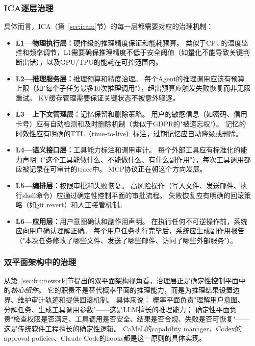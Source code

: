 \subsubsection{ICA逐层治理}
具体而言，ICA（第~\ref{sec:icam}节）的每一层都需要对应的治理机制：

\begin{itemize}[nosep]
\item \textbf{L1---物理执行层：}硬件级的推理精度保证和能耗预算。
类似于CPU的温度监控和频率调节，L1需要确保推理精度不低于安全阈值（如量化不能导致关键判断出错），以及GPU/TPU的能耗在可控范围内。

\item \textbf{L2---推理服务层：}推理预算和精度治理。
每个Agent的推理调用应该有预算上限（如"每个子任务最多10次推理调用"），超出预算应触发失败恢复而非无限重试。
KV缓存管理需要保证关键状态不被意外驱逐。

\item \textbf{L3---上下文管理层：}记忆保留和删除策略。
用户的敏感信息（如密码、信用卡号）应有自动检测和及时删除机制（类似于GDPR的"被遗忘权"）。
记忆的时效性应有明确的TTL（time-to-live）标注，过期记忆应自动降级或删除。

\item \textbf{L4---语义接口层：}工具能力标注和调用审计。
每个外部工具应有标准化的能力声明（"这个工具能做什么、不能做什么、有什么副作用"），每次工具调用都应被记录在可审计的trace中。
MCP协议\cite{mcp_intro_2026}正在朝这个方向发展。

\item \textbf{L5---编排层：}权限审批和失败恢复。
高风险操作（写入文件、发送邮件、执行shell命令）应通过确定性控制平面的审批流程。
失败恢复应有明确的回滚策略（如git revert）和人工接管机制。

\item \textbf{L6---应用层：}用户意图确认和副作用声明。
在执行任何不可逆操作前，系统应向用户确认理解正确。
每个用户任务执行完毕后，系统应生成副作用报告（"本次任务修改了哪些文件、发送了哪些邮件、访问了哪些外部服务"）。
\end{itemize}

\subsubsection{双平面架构中的治理}
从第~\ref{sec:framework}节提出的双平面架构视角看，治理层正是确定性控制平面中的\emph{核心组件}。
它的职责不是替代概率平面的推理能力，而是为推理结果设置边界、维护审计轨迹和提供回滚机制。
具体来说：
概率平面负责"理解用户意图、分解任务、生成工具调用参数"——这是LLM擅长的推理能力；
确定性平面负责"检查权限是否满足、工具调用是否安全、结果是否合规、失败是否可恢复"——这是传统软件工程擅长的确定性逻辑。
CaMeL\cite{debenedetti2025camel}的capability manager、Codex\cite{openai_codex_approvals_2026}的approval policies、Claude Code\cite{anthropic_claudecode_security_2026}的hooks都是这一原则的具体实现。


